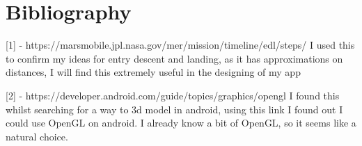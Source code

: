 \documentclass[11pt,fleqn,twoside]{article}
\begin{document}
\section*{Bibliography}

 [1] - https://marsmobile.jpl.nasa.gov/mer/mission/timeline/edl/steps/
I used this to confirm my ideas for entry descent and landing, as it has approximations on distances, I will find this extremely useful in the designing of my app

[2] - https://developer.android.com/guide/topics/graphics/opengl
I found this whilst searching for a way to 3d model in android, using this link I found out I could use OpenGL on android. I already know a bit of OpenGL, so it seems like a natural choice.

\nocite{*} %
\newpage
{}
%
%

\renewcommand{\refname}{Annotated Bibliography}  %
\end{document}
